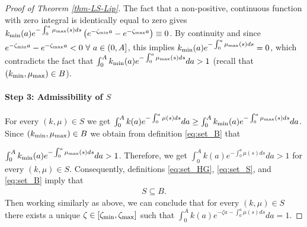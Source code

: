 \documentclass[journal,twoside,web]{ieeecolor}
\begin{document}
\begin{proof}[Proof of Theorem \ref{thm-LS-Lip}]
The fact that a non-positive, continuous function with zero integral 
is identically equal to zero gives
$k_{\rm min}(a) e^{-\int_0^a \mu_{\rm max}(s)ds } \left( e^{-\zeta_{\rm min} a} - e^{-\zeta_{\rm max} a} \right) \equiv 0$. By continuity and since $e^{-\zeta_{\rm min} a} - e^{-\zeta_{\rm max} a} < 0 \ \forall \ a \in (0,A]$, this implies $k_{\rm min}(a) e^{-\int_0^a \mu_{\rm max}(s) ds } = 0$, which contradicts the fact that $\int_0^A k_{\rm min}(a) e^{-\int_0^a \mu_{\rm max}(s) ds } da > 1$ (recall that $(k_{\rm min},\mu_{\rm max}) \in B$).




\paragraph*{Step 3: Admissibility of $S$}
For every $(k,\mu)\in S$ we get $\int_0^A k(a) e^{-\int_0^a \mu(s)ds} da \ge 
\int_0^A k_{\rm min}(a) e^{-\int_0^a \mu_{\rm max}(s)ds} da$. Since $(k_{\rm min},\mu_{\rm max}) \in B$ we obtain from definition \eqref{eq:set_B} that 

\noindent $\int_0^A k_{\rm min}(a) e^{-\int_0^a \mu_{\rm max}(s) ds} da > 1$. 
Therefore, we get $\int_0^A k(a) e^{-\int_0^a \mu(s)ds} da > 1$ for every $(k,\mu)\in S$. Consequently, definitions \eqref{eq:set_HG}, \eqref{eq:set_S}, and \eqref{eq:set_B} imply that
\begin{align}
S \subseteq B. 
\end{align}
Then working similarly as above, we can conclude that for every $(k,\mu)\in S$ there exists a unique $\zeta\in [\zeta_{\rm min},\zeta_{\rm max}]$ such that 
$\int_0^A k(a) e^{-\zeta a - \int_0^a \mu(s) ds} da = 1$.


\end{proof}
\end{document}
